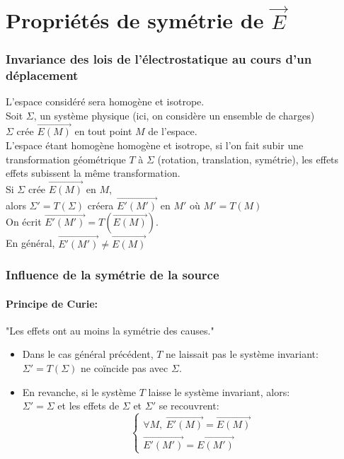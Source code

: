 \documentclass[../main.tex]{subfile}
\begin{document}
\part{Propriétés de symétrie de $\vec{E}$}
\section{Invariance des lois de l'électrostatique au cours d'un déplacement}
	L'espace considéré sera homogène et isotrope.\\
	Soit $\Sigma$, un système physique (ici, on considère un ensemble de charges)\\
	$\Sigma$ crée $\vec{E(M)}$ en tout point $M$ de l'espace.\\
	L'espace étant homogène homogène et isotrope, si l'on fait subir une transformation
	géométrique $T$ à $\Sigma$ (rotation, translation, symétrie), les effets effets 
	subissent la même transformation.\\
	Si $\Sigma$ crée $\vec{E(M)}$ en $M$, \\
	alors $\Sigma' = T(\Sigma)$ créera $\vec{E'(M')}$ en $M'$ où $M' = T(M)$\\
	On écrit $\vec{E'(M')} = T(\vec{E(M)})$.\\
	En général, $\vec{E'(M')} \neq \vec{E(M)}$

\section{Influence de la symétrie de la source}
\subsection{Principe de Curie:}
\begin{theo}
	"Les effets ont au moins la symétrie des causes."
\end{theo}

\begin{itemize}
	\item
	Dans le cas général précédent, $T$ ne laissait pas le système invariant:\\
	$\Sigma' = T(\Sigma)$ ne coïncide pas avec $\Sigma$.
	
	\item En revanche, si le système $T$ laisse le système invariant, alors:\\
	$\Sigma' = \Sigma$ et les effets de $\Sigma$ et $\Sigma'$ se recouvrent:
	$$
\left\{
\begin{array}{c}
	\forall M, \ \vec{E'(M)} = \vec{E(M)}\\
	\vec{E'(M')} = \vec{E(M')}
\end{array}
\right.
	$$
\end{itemize}
\end{document}

